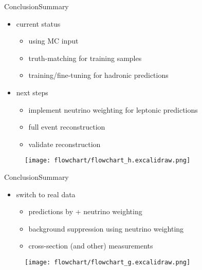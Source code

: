 \documentclass[9pt, aspectratio=169]{beamer}
\begin{document}
\begin{frame}{Conclusion}{Summary}
	\begin{minipage}{.75\textwidth}
		\begin{itemize}
			\item current status   
			\begin{itemize}
				\item using MC input
				\item truth-matching for training samples
				\item training/fine-tuning \spanet for hadronic predictions
			\end{itemize}
			\item next steps
			\begin{itemize}
				\item implement neutrino weighting for leptonic predictions
				\item full event reconstruction
				\item validate reconstruction
			\end{itemize}
		\end{itemize}
	\end{minipage}\hfill
	\begin{minipage}{.2\textwidth}
		\begin{figure}
			\centering
			\texttt{[image: flowchart/flowchart\_h.excalidraw.png]}
		\end{figure}
	\end{minipage}
\end{frame}

\addtocounter{framenumber}{-1} 

\begin{frame}{Conclusion}{Summary}
	\begin{minipage}{.75\textwidth}
		\begin{itemize}
			\item switch to real data
			\begin{itemize}
				\item predictions by \spanet + neutrino weighting
				\item background suppression using neutrino weighting 
				\item cross-section (and other) measurements
			\end{itemize}
		\end{itemize}
	\end{minipage}\hfill
	\begin{minipage}{.2\textwidth}
		\begin{figure}
			\centering
			\texttt{[image: flowchart/flowchart\_g.excalidraw.png]}
		\end{figure}
	\end{minipage}
\end{frame}
\end{document}
